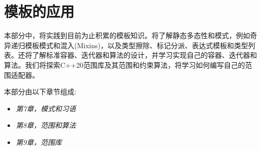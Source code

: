 \part{模板的应用}
本部分中，将实践到目前为止积累的模板知识。将了解静态多态性和模式，例如奇异递归模板模式和混入(Mixins)，以及类型擦除、标记分派、表达式模板和类型列表。还将了解标准容器、迭代器和算法的设计，并学习实现自己的容器、迭代器和算法。我们将探索C++20范围库及其范围和约束算法，将学习如何编写自己的范围适配器。

本部分由以下章节组成:

\begin{itemize}
  \item \textit{第7章，模式和习语}
  \item \textit{第8章，范围和算法}
  \item \textit{第9章，范围库}
\end{itemize}



